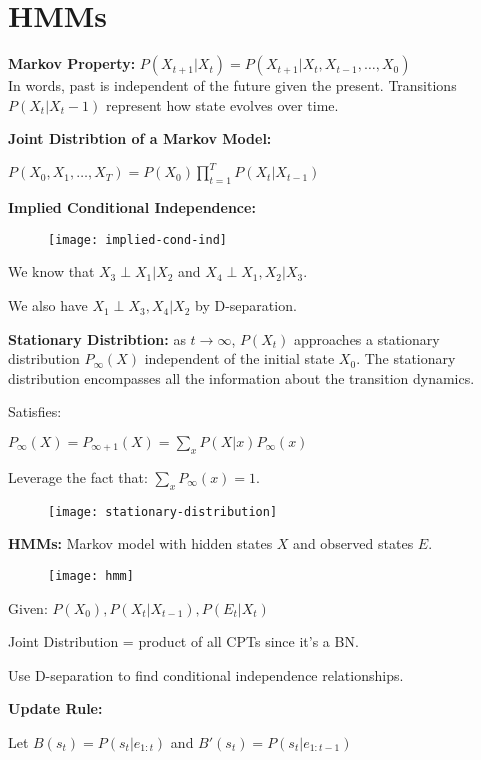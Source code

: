 \section{HMMs}
\textbf{Markov Property:} $P(X_{t+1}|X_t) = P(X_{t+1}|X_t, X_{t-1}, \dots, X_0)$\\
In words, past is independent of the future given the present.
Transitions $P(X_t|X_t-1)$ represent how state evolves over time.

\textbf{Joint Distribtion of a Markov Model:}

$P(X_0, X_1, \dots, X_T) = P(X_0) \prod_{t=1}^T P(X_t|X_{t-1})$

\textbf{Implied Conditional Independence:}
\begin{figure}[H]
    \centering
    \texttt{[image: implied-cond-ind]}
\end{figure}

We know that $X_3 \perp X_1 | X_2$ and $X_4 \perp X_1, X_2 | X_3$.

We also have $X_1 \perp X_3, X_4 | X_2$ by D-separation.

\textbf{Stationary Distribtion:} as $t \rightarrow \infty$, $P(X_t)$ approaches a stationary distribution $P_\infty(X)$ independent of the initial state $X_0$.
The stationary distribution encompasses all the information about the transition dynamics.

Satisfies:

$P_\infty(X) = P_{\infty + 1}(X) = \sum_x P(X|x)P_\infty(x)$

Leverage the fact that: $\sum_x P_\infty(x) = 1$.
\begin{figure}[H]
    \centering
    \texttt{[image: stationary-distribution]}
\end{figure}

\textbf{HMMs:} Markov model with hidden states $X$ and observed states $E$.
\begin{figure}[H]
    \centering
    \texttt{[image: hmm]}
\end{figure}

Given: $P(X_0), P(X_t|X_{t-1}), P(E_t|X_t)$

Joint Distribution = product of all CPTs since it's a BN.

Use D-separation to find conditional independence relationships.

\textbf{Update Rule:}

Let $B(s_t) = P(s_t|e_{1:t})$ and $B'(s_{t}) = P(s_{t}|e_{1:t-1})$

